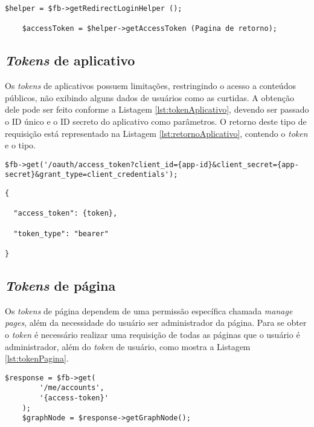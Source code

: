 \begin{lstlisting}[caption={Obtendo Token de acesso a página},label={lst:tokenUsuario}]
	$helper = $fb->getRedirectLoginHelper ();
	
	$accessToken = $helper->getAccessToken (Pagina de retorno);
\end{lstlisting}

\subsection{\textit{Tokens} de aplicativo}
Os \textit{tokens} de aplicativos possuem limitações, restringindo o acesso a conteúdos públicos, não exibindo alguns dados de usuários como as curtidas. A obtenção dele pode ser feito conforme a Listagem \ref{lst:tokenAplicativo}, devendo ser passado o ID único e o ID secreto do aplicativo como parâmetros. O retorno deste tipo de requisição está representado na Listagem \ref{lst:retornoAplicativo}, contendo o \textit{token} e o tipo.

\begin{lstlisting}[caption={Obtendo \textit{token} de acesso de aplicativos},label={lst:tokenAplicativo}]
    $fb->get('/oauth/access_token?client_id={app-id}&client_secret={app-secret}&grant_type=client_credentials');
\end{lstlisting}

\begin{lstlisting}[caption={Retorno ao solicitar o \textit{token} de acesso de aplicativo},label={lst:retornoAplicativo}]
{

  "access_token": {token},
  
  "token_type": "bearer"
  
}
\end{lstlisting}

\subsection{\textit{Tokens} de página}
Os \textit{tokens} de página dependem de uma permissão específica chamada \textit{manage\underline{{ }}pages}, além da necessidade do usuário ser administrador da página. Para se obter o \textit{token} é necessário realizar uma requisição de todas as páginas que o usuário é administrador, além do \textit{token} de usuário, como mostra a Listagem \ref{lst:tokenPagina}.

\begin{lstlisting}[caption={Obtendo Token de acesso a página},label={lst:tokenPagina}]
    $response = $fb->get(
        '/me/accounts',
        '{access-token}'
    );
    $graphNode = $response->getGraphNode();
\end{lstlisting}

